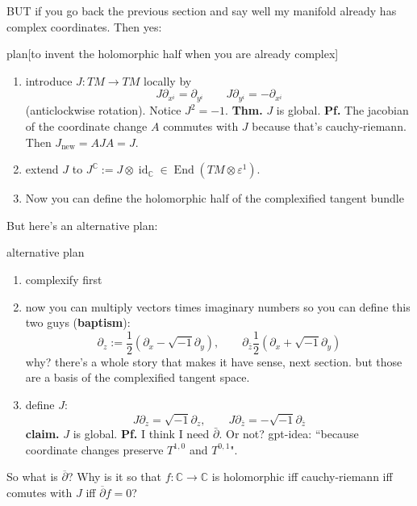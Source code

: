 BUT if you go back the previous section and say well my manifold already has complex coordinates. Then yes:
\begin{thing6}{plan}[to invent the holomorphic half when you are already complex]\leavevmode
\begin{enumerate}[label=\textbf{Step \arabic*}]
\item introduce \(J:TM \to TM\) locally by
\[J \partial_{x^i}=\partial_{y^i} \qquad J\partial_{y^i}=-\partial_{x^i}\]
(anticlockwise rotation). Notice \(J^2 =-1\). \textbf{Thm.} \(J\) is global. \textbf{Pf.} The jacobian of the coordinate change \(A\) commutes with \(J\) because that's cauchy-riemann. Then \(J_{\operatorname{new}}=A J A=J\).
\item extend \(J\) to \(J^\mathbb{C}:=J \otimes \operatorname{id}_\mathbb{C}\in \operatorname{End}(TM \otimes \varepsilon^1)\).
\item Now you can define the holomorphic half of the complexified tangent bundle
\end{enumerate}
\end{thing6}

But here's an alternative plan:
\begin{thing6}{alternative plan}\leavevmode
\begin{enumerate}[label=\textbf{Step \arabic*}]
\item complexify first
\item now you can multiply vectors times imaginary numbers so you can define this two guys (\textbf{baptism}):
	\[\partial_z:=\frac{1}{2}(\partial_x-\sqrt{-1}\partial_y),\qquad \partial_{\bar{z}}\frac{1}{2}(\partial_x+\sqrt{-1}\partial_y)\]
	why? there's a whole story that makes it have sense, next section. but those are a basis of the complexified tangent space.
\item define \(J\):
	\[J\partial_z=\sqrt{-1}\partial_z,\qquad J\partial_{\overline{z}}=-\sqrt{-1}\partial_{\overline{z}}\]
\textbf{claim.} \(J\) is global. \textbf{Pf.} I think I need \(\bar\partial\). Or not? gpt-idea: ``because coordinate changes preserve \(T^{1,0}\) and \(T^{0,1}\)".
\end{enumerate}
\end{thing6}

So what is \(\overline{\partial}\)? Why is it so that \(f:\mathbb{C} \to \mathbb{C}\) is holomorphic iff cauchy-riemann iff comutes with \(J\) iff \(\overline{\partial}f=0\)?

